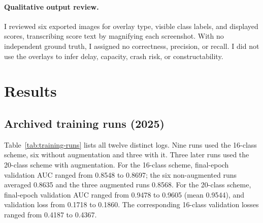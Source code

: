 \documentclass[11pt]{article}
\begin{document}
\paragraph{Qualitative output review.} I reviewed six exported images for overlay type, visible class labels, and displayed scores, transcribing score text by magnifying each screenshot. With no independent ground truth, I assigned no correctness, precision, or recall. I did not use the overlays to infer delay, capacity, crash risk, or constructability.

\section{Results}
\subsection{Archived training runs (2025)}
Table~\ref{tab:training-runs} lists all twelve distinct logs. Nine runs used the 16-class scheme, six without augmentation and three with it. Three later runs used the 20-class scheme with augmentation. For the 16-class scheme, final-epoch validation AUC ranged from 0.8548 to 0.8697; the six non-augmented runs averaged 0.8635 and the three augmented runs 0.8568. For the 20-class scheme, final-epoch validation AUC ranged from 0.9478 to 0.9605 (mean 0.9544), and validation loss from 0.1718 to 0.1860. The corresponding 16-class validation losses ranged from 0.4187 to 0.4367.
\end{document}
